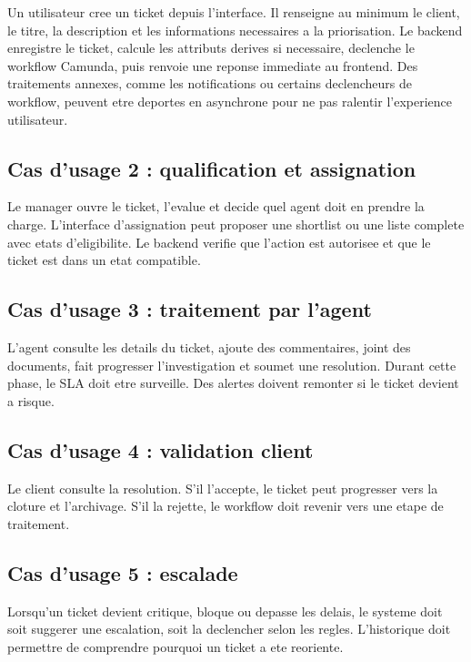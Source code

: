 \documentclass[12pt,a4paper,oneside]{report}
\begin{document}
Un utilisateur cree un ticket depuis l'interface. Il renseigne au minimum le client, le titre, la description et les informations necessaires a la priorisation. Le backend enregistre le ticket, calcule les attributs derives si necessaire, declenche le workflow Camunda, puis renvoie une reponse immediate au frontend. Des traitements annexes, comme les notifications ou certains declencheurs de workflow, peuvent etre deportes en asynchrone pour ne pas ralentir l'experience utilisateur.

\subsection{Cas d'usage 2 : qualification et assignation}

Le manager ouvre le ticket, l'evalue et decide quel agent doit en prendre la charge. L'interface d'assignation peut proposer une shortlist ou une liste complete avec etats d'eligibilite. Le backend verifie que l'action est autorisee et que le ticket est dans un etat compatible.

\subsection{Cas d'usage 3 : traitement par l'agent}

L'agent consulte les details du ticket, ajoute des commentaires, joint des documents, fait progresser l'investigation et soumet une resolution. Durant cette phase, le SLA doit etre surveille. Des alertes doivent remonter si le ticket devient a risque.

\subsection{Cas d'usage 4 : validation client}

Le client consulte la resolution. S'il l'accepte, le ticket peut progresser vers la cloture et l'archivage. S'il la rejette, le workflow doit revenir vers une etape de traitement.

\subsection{Cas d'usage 5 : escalade}

Lorsqu'un ticket devient critique, bloque ou depasse les delais, le systeme doit soit suggerer une escalation, soit la declencher selon les regles. L'historique doit permettre de comprendre pourquoi un ticket a ete reoriente.
\end{document}
